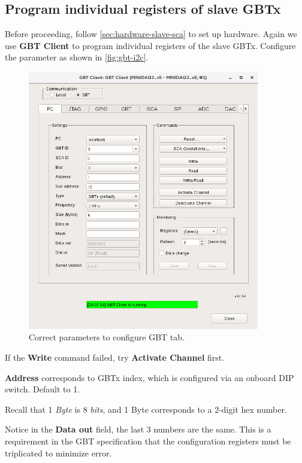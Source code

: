 \subsection{Program individual registers of slave GBTx}
\label{sec:software-slave-individual}
Before proceeding, follow \autoref{sec:hardware-slave-sca} to set up hardware.
Again we use \textbf{GBT Client} to program individual registers of the slave
GBTx.
Configure the parameter as shown in \autoref{fig:gbt-i2c}.

\begin{figure}[ht]
    \centering
    \includegraphics[width=0.9\textwidth]{res/gbt_client_slave_gbt_i2c_test.png}
    \caption{Correct parameters to configure GBT \itwoc tab.}
    \label{fig:gbt-i2c}
\end{figure}

\begin{leftbar}
    If the \textbf{Write} command failed, try \textbf{Activate Channel} first.
\end{leftbar}

\begin{leftbar}
    \textbf{Address} corresponds to GBTx index, which is configured via an
    onboard DIP switch. Default to 1.
\end{leftbar}

\begin{leftbar}
    Recall that 1 \emph{Byte} is 8 \emph{bits}, and 1 Byte corresponds to a
    2-digit hex number.
\end{leftbar}

\begin{leftbar}
    Notice in the \textbf{Data out} field, the last 3 numbers are the same.
    This is a requirement in the GBT specification that the configuration
    registers must be triplicated to minimize error.
\end{leftbar}
